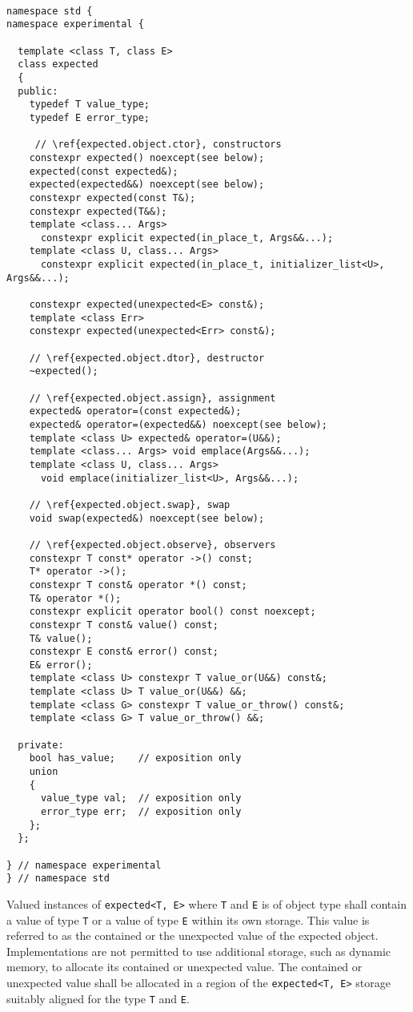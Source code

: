 \documentclass[a4paper,10pt]{article}
\newcommand{\cpp}[1]{\lstinline{#1}}
\begin{document}
\begin{lstlisting}

namespace std {
namespace experimental {

  template <class T, class E>
  class expected
  {
  public:
    typedef T value_type;
    typedef E error_type;
    
     // \ref{expected.object.ctor}, constructors
    constexpr expected() noexcept(see below);
    expected(const expected&);
    expected(expected&&) noexcept(see below);
    constexpr expected(const T&);
    constexpr expected(T&&);
    template <class... Args> 
      constexpr explicit expected(in_place_t, Args&&...);     
    template <class U, class... Args>
      constexpr explicit expected(in_place_t, initializer_list<U>, Args&&...);
      
    constexpr expected(unexpected<E> const&);
    template <class Err> 
    constexpr expected(unexpected<Err> const&);

    // \ref{expected.object.dtor}, destructor
    ~expected();

    // \ref{expected.object.assign}, assignment
    expected& operator=(const expected&);
    expected& operator=(expected&&) noexcept(see below);
    template <class U> expected& operator=(U&&);
    template <class... Args> void emplace(Args&&...);
    template <class U, class... Args>
      void emplace(initializer_list<U>, Args&&...);

    // \ref{expected.object.swap}, swap
    void swap(expected&) noexcept(see below);

    // \ref{expected.object.observe}, observers
    constexpr T const* operator ->() const;
    T* operator ->();
    constexpr T const& operator *() const;
    T& operator *();
    constexpr explicit operator bool() const noexcept;
    constexpr T const& value() const;
    T& value();
    constexpr E const& error() const;
    E& error();
    template <class U> constexpr T value_or(U&&) const&;
    template <class U> T value_or(U&&) &&;
    template <class G> constexpr T value_or_throw() const&;
    template <class G> T value_or_throw() &&;

  private:
    bool has_value;    // exposition only
    union
    {
      value_type val;  // exposition only
      error_type err;  // exposition only
    };
  };

} // namespace experimental
} // namespace std
\end{lstlisting}


Valued instances of \cpp{expected<T, E>} where \cpp{T} and \cpp{E} is of object type shall contain a value of type \cpp{T} or a value of type \cpp{E} within its own storage. This value is referred to as the contained or the unexpected value of the expected object. Implementations are not permitted to use additional storage, such as dynamic memory, to allocate its contained or unexpected value. The contained or unexpected value shall be allocated in a region of the \cpp{expected<T, E>} storage suitably aligned for the type \cpp{T} and \cpp{E}.
\newline
\end{document}
